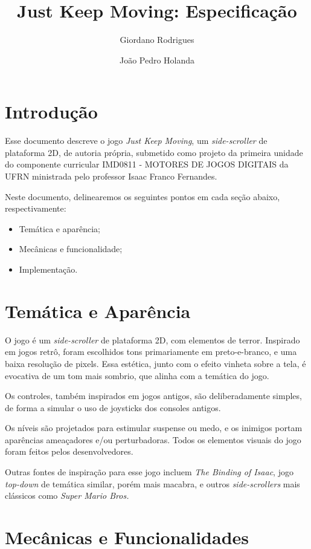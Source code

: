 \documentclass[a4paper]{article}
\title{Just Keep Moving: Especificação}
\author{Giordano Rodrigues \and João Pedro Holanda}
\date{}
\begin{document}
\maketitle

\section{Introdução}

Esse documento descreve o jogo \emph{Just Keep Moving}, um \emph{side-scroller} de plataforma 2D, de autoria própria, submetido como projeto da primeira unidade do componente curricular IMD0811 - MOTORES DE JOGOS DIGITAIS da UFRN ministrada pelo professor Isaac Franco Fernandes.


Neste documento, delinearemos os seguintes pontos em cada seção abaixo, respectivamente:
\begin{itemize}
	\item Temática e aparência;
	\item Mecânicas e funcionalidade;
	\item Implementação.
\end{itemize}

\section{Temática e Aparência}

O jogo é um \emph{side-scroller} de plataforma 2D, com elementos de terror. Inspirado em jogos retrô, foram escolhidos tons primariamente em preto-e-branco, e uma baixa resolução de pixels. Essa estética, junto com o efeito vinheta sobre a tela, é evocativa de um tom mais sombrio, que alinha com a temática do jogo.

Os controles, também inspirados em jogos antigos, são deliberadamente simples, de forma a simular o uso de joysticks dos consoles antigos.

Os níveis são projetados para estimular suspense ou medo, e os inimigos portam aparências ameaçadores e/ou perturbadoras. Todos os elementos visuais do jogo foram feitos pelos desenvolvedores.

Outras fontes de inspiração para esse jogo incluem \emph{The Binding of Isaac}, jogo \emph{top-down} de temática similar, porém mais macabra, e outros \emph{side-scrollers} mais clássicos como \emph{Super Mario Bros.}

\section{Mecânicas e Funcionalidades}
\end{document}
